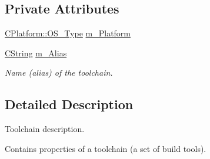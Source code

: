 \subsection*{Private Attributes}
\begin{DoxyCompactItemize}
\item 
\hyperlink{classCPlatform_a2fb735c63c53052f79629e338bb0f535}{C\-Platform\-::\-O\-S\-\_\-\-Type} \hyperlink{classCToolChain_a438936ebbad439c162dc30d55d540fae}{m\-\_\-\-Platform}
\item 
\hyperlink{classCString}{C\-String} \hyperlink{classCToolChain_afda7f2ac3cb9b3d6a761ce31e52b9b6b}{m\-\_\-\-Alias}
\begin{DoxyCompactList}\small\item\em Name (alias) of the toolchain. \end{DoxyCompactList}\end{DoxyCompactItemize}


\subsection{Detailed Description}
Toolchain description. 

Contains properties of a toolchain (a set of build tools). 

